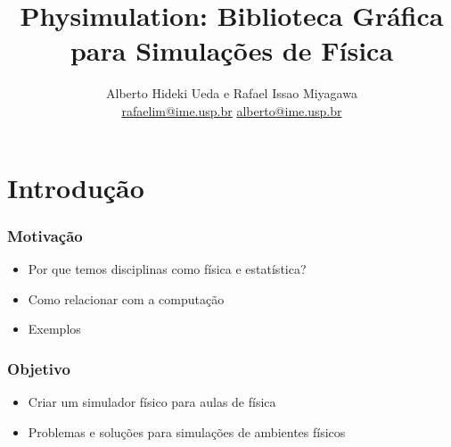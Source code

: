 \documentclass{beamer}
\title{Physimulation: Biblioteca Gráfica para Simulações de Física}
\author{Alberto Hideki Ueda e Rafael Issao Miyagawa\\ \url{rafaelim@ime.usp.br} \url{alberto@ime.usp.br}}
\institute{Instituto de Matemática e Estatística\\Universidade de São Paulo}
\begin{document}
\frame{\titlepage}
\frame{\tableofcontents}
\section{Introdução}
\begin{frame}
  \frametitle{Motivação}
  \begin{itemize}
    \item Por que temos disciplinas como física e estatística?
    \item Como relacionar com a computação
    \item Exemplos
  \end{itemize} 
\end{frame}
\begin{frame}
  \frametitle{Objetivo}
  \begin{itemize}
    \item Criar um simulador físico para aulas de física
    \item Problemas e soluções para simulações de ambientes físicos
  \end{itemize}
\end{frame}
\end{document}
